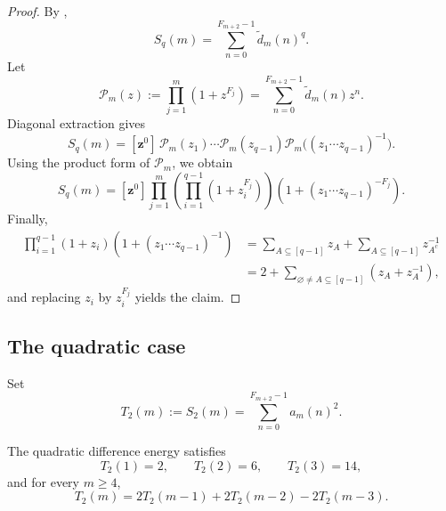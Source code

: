 \begin{proof}
By ,
\[
  S_q(m)
  =
  \sum_{n=0}^{F_{m+2}-1}\widetilde d_m(n)^q.
\]
Let
\[
  \mathcal P_m(z):=\prod_{j=1}^m(1+z^{F_j})
  =
  \sum_{n=0}^{F_{m+2}-1}\widetilde d_m(n)z^n.
\]
Diagonal extraction gives
\[
  S_q(m)
  =
  [\mathbf z^0]\,
  \mathcal P_m(z_1)\cdots \mathcal P_m(z_{q-1})
  \mathcal P_m\bigl((z_1\cdots z_{q-1})^{-1}\bigr).
\]
Using the product form of \(\mathcal P_m\), we obtain
\[
  S_q(m)
  =
  [\mathbf z^0]
  \prod_{j=1}^m
  \left(
    \prod_{i=1}^{q-1}(1+z_i^{F_j})
  \right)
  \left(
    1+(z_1\cdots z_{q-1})^{-F_j}
  \right).
\]
Finally,
\begin{align*}
  \prod_{i=1}^{q-1}(1+z_i)\left(1+(z_1\cdots z_{q-1})^{-1}\right)
  &=
  \sum_{A\subseteq [q-1]}z_A
  +
  \sum_{A\subseteq [q-1]}z_{A^c}^{-1} \\
  &=
  2+\sum_{\varnothing\neq A\subseteq [q-1]}(z_A+z_A^{-1}),
\end{align*}
and replacing \(z_i\) by \(z_i^{F_j}\) yields the claim.
\end{proof}

\subsection{The quadratic case}

\begin{definition}
\label{def:T2}
Set
\[
  T_2(m):=S_2(m)=\sum_{n=0}^{F_{m+2}-1} a_m(n)^2.
\]
\end{definition}

\begin{theorem}
\label{thm:cubic-recurrence}
The quadratic difference energy satisfies
\[
  T_2(1)=2,\qquad T_2(2)=6,\qquad T_2(3)=14,
\]
and for every \(m\ge 4\),
\[
  T_2(m)=2T_2(m-1)+2T_2(m-2)-2T_2(m-3).
\]
\end{theorem}

